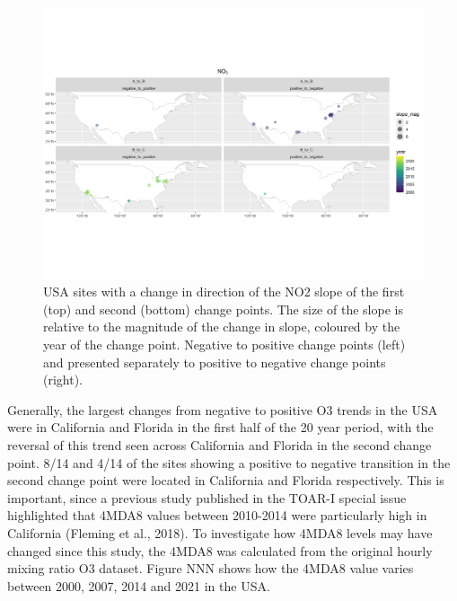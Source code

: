 \documentclass[journal abbreviation, manuscript]{copernicus}
\begin{document}
\begin{figure}[t]
\includegraphics[width=12cm]{plots/US_no2_tau_0.5_changepoint_year_mag_map.png}
\caption{USA sites with a change in direction of the NO2 slope of the first (top) and second (bottom) change points. The size of the slope is relative to the magnitude of the change in slope, coloured by the year of the change point. Negative to positive change points (left) and presented separately to positive to negative change points (right).}
\label{us_no2_changepoint_map}
\end{figure}

Generally, the largest changes from negative to positive O3 trends in the USA were in California and Florida in the first half of the 20 year period, with the reversal of this trend seen across California and Florida in the second change point. 8/14 and 4/14 of the sites showing a positive to negative transition in the second change point were located in California and Florida respectively. This is important, since a previous study published in the TOAR-I special issue highlighted that 4MDA8 values between 2010-2014 were particularly high in California (Fleming et al., 2018). To investigate how 4MDA8 levels may have changed since this study, the 4MDA8 was calculated from the original hourly mixing ratio O3 dataset. Figure NNN shows how the 4MDA8 value varies between 2000, 2007, 2014 and 2021 in the USA.
\end{document}
